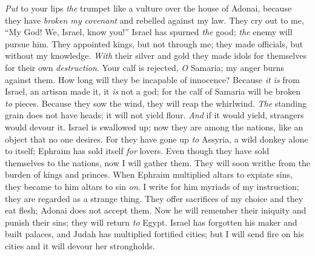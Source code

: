 \begin{biblechapter} %
 \textit{Put} to your lips \textit{the} trumpet 
like a vulture over the house of Adonai, 
because they have \textit{broken my covenant} 
and rebelled against my law.
\verse They cry out to me, 
“My God! We, Israel, know you!”
\verse Israel has spurned \textit{the} good; 
\textit{the} enemy will pursue him.
\verse They appointed kings, but not through me; 
they made officials, but without my knowledge. 
\textit{With} their silver and gold 
they made idols for themselves 
for their own \textit{destruction}.
\verse Your calf is rejected, \textit{O} Samaria; 
my anger burns against them. 
How long will they be incapable of innocence?
\verse Because \textit{it is} from Israel, 
an artisan made it, 
it \textit{is} not a god; 
for the calf of Samaria 
will be broken \textit{to} pieces.
\verse Because they sow the wind, 
they will reap the whirlwind. 
\textit{The} standing grain does not have heads; 
it will not yield flour. 
\textit{And} if it would yield, 
strangers would devour it.
\verse Israel is swallowed up; 
now they are among the nations, 
like an object that no one desires.
\verse For they have gone up \textit{to} Assyria, 
a wild donkey alone to itself; 
Ephraim has sold itself \textit{for} lovers.
\verse Even though they have sold themselves to the nations, 
now I will gather them. 
They will soon writhe 
from the burden of kings and princes.
\verse When Ephraim multiplied altars 
to expiate sins, 
they became to him altars to sin \textit{on}.
\verse I write for him myriads of my instruction; 
they are regarded as a strange thing.
\verse They offer sacrifices of my choice 
and they eat flesh; 
Adonai does not accept them. 
Now he will remember their iniquity 
and punish their sins; 
they will return \textit{to} Egypt.
\verse Israel has forgotten his maker and built palaces, 
and Judah has multiplied fortified cities; 
but I will send fire on his cities 
and it will devour her strongholds.
\end{biblechapter}

